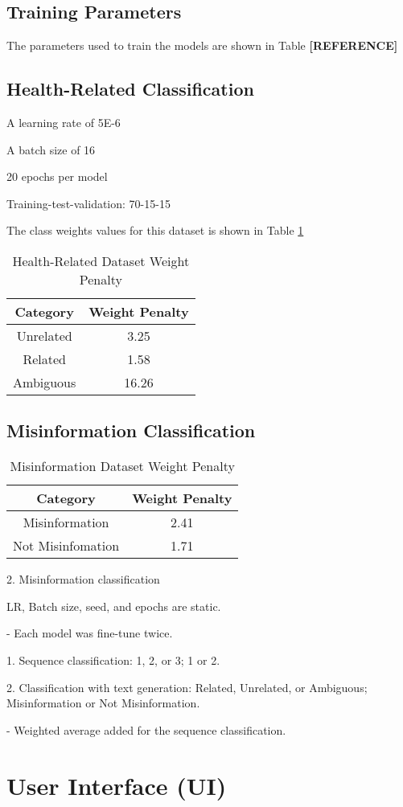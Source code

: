 \subsection{Training Parameters}
The parameters used to train the models are shown in Table \textbf{[REFERENCE]}


\subsection{Health-Related Classification}
A learning rate of 5E-6

A batch size of 16

20 epochs per model

Training-test-validation: 70-15-15

The class weights values for this dataset is shown in Table \ref{table:healthweight}


\begin{table}[H]
	\centering
	\caption{Health-Related Dataset Weight Penalty}
	\begin{tabular}{||c | c||} 
			\hline
			\textbf{Category} & \textbf{Weight Penalty} \\ [1.5ex] 
			\hline
			Unrelated & 3.25 \\ [1ex]
			\hline
			Related & 1.58 \\[1ex]
			\hline
			Ambiguous & 16.26 \\[1ex]
			\hline
		\end{tabular}
	\label{table:healthweight}
\end{table}


\subsection{Misinformation Classification}

\begin{table}[H]
	\centering
	\caption{Misinformation Dataset Weight Penalty}
	\begin{tabular}{||c | c||} 
		\hline
		\textbf{Category} & \textbf{Weight Penalty} \\ [1.5ex] 
		\hline
		Misinformation & 2.41  \\ [1ex]
		\hline
		Not Misinfomation & 1.71  \\[1ex]
		\hline
	\end{tabular}
	\label{table:misinformationweights}
\end{table}

2. Misinformation classification

LR, Batch size, seed, and epochs are static.

- Each model was fine-tune twice.

    1. Sequence classification: 1, 2, or 3; 1 or 2.

    2. Classification with text generation: Related, Unrelated, or Ambiguous; Misinformation or Not Misinformation.

- Weighted average added for the sequence classification.

\section{User Interface (UI)}
